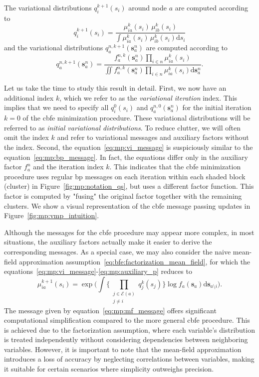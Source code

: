 The variational distributions $q^{k+1}_i(s_i)$ around node $a$ are computed according to
\begin{equation}
    q^{k+1}_i(s_i) =
    \frac{\mu^{k}_{ia}(s_i)\,\mu^{k}_{ib}(s_i)}{\int \mu^{k}_{ia}(s_i)\,\mu^{k}_{ib}(s_i)
      \mathrm{d}s_i}
    \label{eq:mp:variational_q_i}
\end{equation} and the variational distributions $q^{n,k+1}_a(\bm{s}^n_a)$ are
computed according to \begin{equation} \label{eq:mp:variational_q_a} q^{n, k+1}_a(\bm{s}^n_a)
  = \frac{f^{n, k}_a(\bm{s}^n_a)\prod_{i \in n}\mu^{k}_{ia}(s_i)}{\iint
    f^{n,k}_a(\bm{s}^n_a)\prod_{i \in n}\mu^{k}_{ia}(s_i)\mathrm{d}\bm{s}^n_a}.
\end{equation}

Let us take the time to study this result in detail.
First, we now have an additional index $k$, which we refer to as the \textit{variational iteration} index.
This implies that we need to specify all $q^0_i(s_i)$ and $q^{n, 0}_a(\bm{s}^n_a)$ for the
initial iteration $k = 0$ of the \ac{cbfe} minimization procedure.
These variational distributions will be referred to as \textit{initial variational distributions}.
To reduce clutter, we will often omit the index $k$ and refer to variational messages and
auxiliary factors without the index.
Second, the equation~\eqref{eq:mp:vi_message} is suspiciously similar to the
equation~\eqref{eq:mp:bp_message}.
In fact, the equations differ only in the auxiliary factor $f^n_a$ and the iteration index
$k$.
This indicates that the \ac{cbfe} minimization procedure uses regular \ac{bp} messages on each iteration
within each shaded block (cluster) in Figure~\ref{fig:mp:notation_qs}, but uses a different
factor function.
This factor is computed by "fusing" the original factor together with the remaining clusters.
We show a visual representation of the \ac{cbfe} message passing updates in Figure~\ref{fig:mp:vmp_intuition}.

Although the messages for the \ac{cbfe} procedure may appear more complex, in most
situations, the auxiliary factors actually make it easier to derive the corresponding
messages.
As a special case, we may also consider the naive mean-field approximation
assumption~\eqref{eq:bfe:factorization_mean_field}, for which the
equations~\eqref{eq:mp:vi_message}-\eqref{eq:mp:auxiliary_p} reduces to
\begin{equation}\label{eq:mp:mf_message} \mu^{k+1}_{ia}(s_i) = \exp \Big( \int \Big\{
  \prod_{\substack{j \in \mathcal{E}(a)\\j \neq i}} q^k_j(s_j) \Big\} \log
  f_a(\bm{s}_a)\mathrm{d}\bm{s}_{a \setminus i} \Big).
\end{equation}
The message given by equation~\eqref{eq:mp:mf_message} offers significant computational
simplification compared to the more general \ac{cbfe} procedure.
This is achieved due to the factorization assumption, where each variable's distribution is
treated independently without considering dependencies between neighboring variables.
However, it is important to note that the mean-field approximation introduces a loss of
accuracy by neglecting correlations between variables, making it suitable for certain
scenarios where simplicity outweighs precision.

